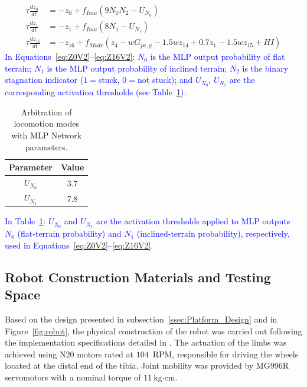 \documentclass[preprint,12pt]{elsarticle}
\newcommand{\revblue}[1]{\textcolor{blue}{#1}}
\begin{document}
\begin{align}
\tau \frac{dz_0}{dt} &= -z_0 + f_{Imu}(9 N_{0} N_{2} - U_{N_{0}})
\label{eq:Z0V2}
\\
\tau \frac{dz_1}{dt} &= -z_1 +  f_{Imu}(8 N_{1} - U_{N_{1}})
\\
\tau \frac{dz_{16}}{dt} &= -z_{16} +  f_{Mode}( z_4 - wG_{pe,y} - 1.5wz_{14}  + 0.7z_1 - 1.5wz_{15} + HI)
\label{eq:Z16V2}
\end{align}
\revblue{In Equations~\eqref{eq:Z0V2}–\eqref{eq:Z16V2}: $N_0$ is the MLP output probability of flat terrain; $N_1$ is the MLP output probability of inclined terrain; $N_2$ is the binary stagnation indicator ($1 ={}$stuck, $0 ={}$not stuck); and $U_{N_0}$, $U_{N_1}$ are the corresponding activation thresholds (see Table~\ref{table:Locom_MLP}).}

\begin{table}%
\centering
\caption{Arbitration of locomotion modes with MLP Network parameters.}
\begin{tabular}{|c|c|}
\hline
\textbf{Parameter} & \textbf{Value} \\ \hline

$U_{N_{0}}$ & 3.7 \\ \hline
$U_{N_{1}}$ & 7.8 \\ \hline

\end{tabular}
\label{table:Locom_MLP}
\end{table}
\revblue{In Table~\ref{table:Locom_MLP}: $U_{N_0}$ and $U_{N_1}$ are the activation thresholds applied to MLP outputs $N_0$ (flat-terrain probability) and $N_1$ (inclined-terrain probability), respectively, used in Equations~\eqref{eq:Z0V2}--\eqref{eq:Z16V2}.}

\subsection{Robot Construction Materials and Testing Space}
\label{ssec:Construction}

Based on the design presented in subsection~\ref{ssec:Platform_Design} and in Figure~\ref{fig:robot}, the physical construction of the robot was carried out following the implementation specifications detailed in \citep{Grajales_Des_2025}. The actuation of the limbs was achieved using N20 motors rated at $104$~RPM, responsible for driving the wheels located at the distal end of the tibia. Joint mobility was provided by MG996R servomotors with a nominal torque of $11~\text{kg·cm}$. 
\end{document}
